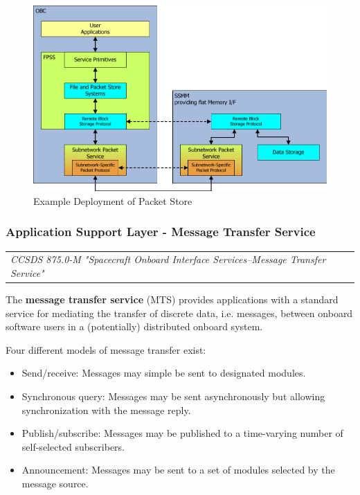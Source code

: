 \begin{figure}[h]
\centering\includegraphics[scale=0.3]{fig/example_deployment_of_packet_store}
\caption{Example Deployment of Packet Store}
\label{fig:Example Deployment of Packet Store}
\end{figure}

\subsubsection{Application Support Layer - Message Transfer Service}

\begin{tabular}{l}
\textit{CCSDS 875.0-M "Spacecraft Onboard Interface Services--Message Transfer Service" \cite{}} 
\end{tabular}

The \textbf{message transfer service} (MTS) provides applications with a standard service for mediating the transfer of discrete data, i.e. messages, between onboard software users in a (potentially) distributed onboard system.

Four different models of message transfer exist:
\begin{itemize}
\item Send/receive: Messages may simple be sent to designated modules.
\item Synchronous query: Messages may be sent asynchronously but allowing synchronization with the message reply.
\item Publish/subscribe: Messages may be published to a time-varying number of self-selected subscribers.
\item Announcement: Messages may be sent to a set of modules selected by the message source.
\end{itemize}

